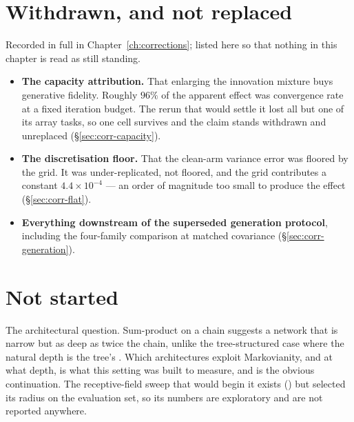 \section{Withdrawn, and not replaced}

Recorded in full in Chapter~\ref{ch:corrections}; listed here so that nothing in this chapter is
read as still standing.

\begin{itemize}\itemsep3pt
\item \textbf{The capacity attribution.} That enlarging the innovation mixture buys generative
      fidelity. Roughly $96\%$ of the apparent effect was convergence rate at a fixed iteration
      budget. The rerun that would settle it lost all but one of its array tasks, so one cell
      survives and the claim stands withdrawn and unreplaced (\S\ref{sec:corr-capacity}).
\item \textbf{The discretisation floor.} That the clean-arm variance error was floored by the
      grid. It was under-replicated, not floored, and the grid contributes a constant
      $4.4\times10^{-4}$ --- an order of magnitude too small to produce the effect
      (\S\ref{sec:corr-flat}).
\item \textbf{Everything downstream of the superseded generation protocol}, including the
      four-family comparison at matched covariance (\S\ref{sec:corr-generation}).
\end{itemize}

\section{Not started}

The architectural question. Sum-product on a chain suggests a network that is narrow but as deep
as twice the chain, unlike the tree-structured case where the natural depth is the tree's
\citep{mei2024unet,garnierbrun2024transformers}. Which architectures exploit Markovianity, and at
what depth, is what this setting was built to measure, and is the obvious continuation. The
receptive-field sweep that would begin it exists () but selected its radius on
the evaluation set, so its numbers are exploratory and are not reported anywhere.
